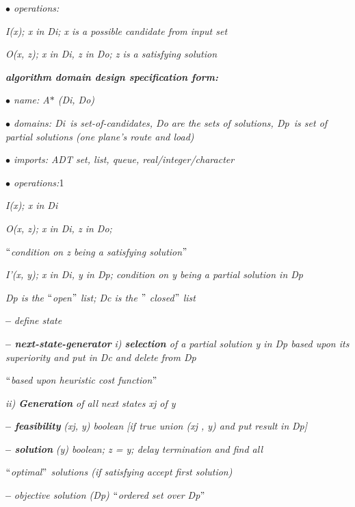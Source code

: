 \documentclass[journal]{IEEEtran}
\begin{document}
\textit{$\bullet$  operations:}\par

\textit{I(x); x in Di; x is a possible candidate from input set}\par

\textit{O(x, z); x in Di, z in Do; z is a satisfying solution\textbf{ }}\par

\vspace{\baselineskip}
\textbf{\textit{algorithm domain design speciﬁcation form:}}\par

\textit{$\bullet$  name:  A$\ast$  (Di, Do)}\par

\textit{$\bullet$  domains:  Di\   is set-of-candidates, Do are the sets of solutions, Dp\   is set of partial solutions (one plane’s route and load)}\par

\textit{$\bullet$  imports:  ADT set, list, queue, real/integer/character}\par

\textit{$\bullet$  operations:}1\par

\textit{I(x); x in Di}\par

\textit{O(x, z); x in Di, z in Do;}\par
\textit{$``$condition on z being a satisfying solution$"$ }\par
\textit{I’(x, y); x in Di, y in Dp; condition on y being a partial solution in Dp}\par
\textit{Dp is the $``$open$"$  list; Dc is the $"$ closed$"$  list}\par
\textbf{–  }\textit{deﬁne state}\par
\textbf{–  \textit{{next-state-generator}}}\p
\textit{i)  \textbf{{selection}} of a partial solution y in Dp based upon its superiority and put in Dc and delete from Dp}\par
\begin{justify}
\textit{$``$based upon heuristic cost function$"$ }
\end{justify}\par
\textit{ii)  \textbf{{Generation}} of all} \textit{next states xj of y}\par
\textbf{–  \textit{{feasibility}}}\textit{ (xj, y) \textrightarrow boolean [if true union (xj , y) and put result} \textit{in} \textit{Dp]}\par
\textbf{–  \textit{{solution}}}\textit{ (y) \textrightarrow boolean;  z = y;  delay termination  and ﬁnd  all}\par
\begin{justify}
\textit{$``$optimal$"$  solutions (if satisfying accept first solution)}
\end{justify}\par
\textbf{–  }\textit{objective solution (Dp) \textrightarrow $``$ordered set over Dp$"$ }\par
\end{document}
